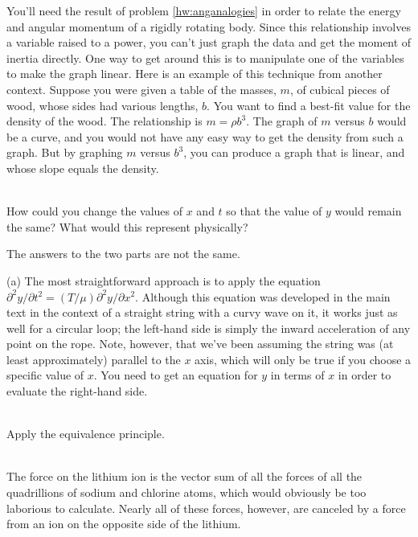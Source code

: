 \label{hwhint:erbium}
You'll need the result of problem \ref{hw:anganalogies} in order
to relate the energy and angular momentum of a rigidly rotating body.
Since this relationship involves a variable raised to a power,
you can't just graph the data and get the moment of inertia
directly. One way to get around this is to
manipulate one of the variables to make the graph linear.
Here is an example of this technique from
another context. Suppose you were given a table of the masses, $m$, of cubical
pieces of wood, whose sides had various lengths, $b$. You want
to find a best-fit value for the density of the wood.
The relationship is $m=\rho b^3$. The graph of $m$ versus $b$ would be a curve,
and you would not have any easy way to get the density from such
a graph. But by graphing $m$ versus $b^3$, you can produce a graph that
is linear, and whose slope equals the density.

\noindent{}\\
\label{hwhint:sinwavekinem}
How could you change the values of $x$ and $t$ so that the value of
$y$ would remain the same? What would this represent physically?

\label{hwhint:airwaterrefl}
The answers to the two parts are not the same.

\label{hwhint:lasso}
(a) The most straightforward approach is to apply the
equation $\partial^2y/\partial t^2=(T/\mu)\partial^2y/\partial x^2$.
Although this equation was developed in the main text in the
context of a straight string with a curvy wave on it, it works just
as well for a circular loop; the left-hand side is simply the inward
acceleration of any point on the rope. Note, however, that we've been
assuming the string was (at least approximately) parallel to the $x$ axis,
which will only be true if you choose a specific value of $x$.
You need to get an equation for
$y$ in terms of $x$ in order to evaluate the right-hand side.

\noindent{}\\
\label{hwhint:tossed-clock}
 Apply the equivalence principle.


\noindent{}\\
\label{hwhint:nacl}
The force
on the lithium ion is the vector sum of all the forces of
all the quadrillions of sodium and chlorine atoms, which
would obviously be too laborious to calculate.  Nearly all
of these forces, however, are canceled by a force from an
ion on the opposite side of the lithium.



